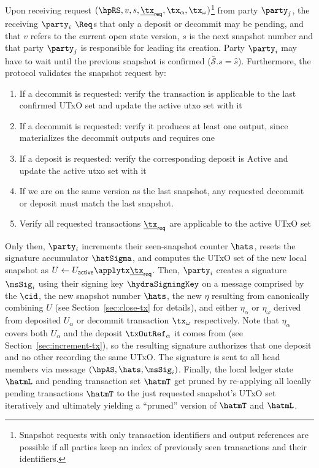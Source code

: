 \quad Upon receiving request
$(\hpRS,v,s,\underline{\tx}_{\mathsf{req}}, \tx_\alpha, \tx_\omega)$\footnote{Snapshot
	requests with only transaction identifiers and output references are possible
	if all parties keep an index of previously seen transactions and their
	identifiers.} from party $\party_j$, the receiving $\party_i$ $\Req$s that
only a deposit or decommit may be pending, and that $v$ refers to the current
open state version, $s$ is the next snapshot number and that party $\party_j$ is
responsible for leading its creation. Party $\party_i$ may have to wait until
the previous snapshot is confirmed ($\bar{\mathcal{S}}.s = \hat{s}$).
Furthermore, the protocol validates the snapshot request by:
\begin{enumerate}
	\item If a decommit is requested: verify the transaction is applicable to the
	      last confirmed UTxO set and update the active utxo set with it
	\item If a decommit is requested: verify it produces at least one output,
	      since \mtxDecrement{} materializes the decommit outputs and requires one
	\item If a deposit is requested: verify the corresponding deposit is
	      $\text{Active}$ and update the active utxo set with it
	\item If we are on the same version as the last snapshot, any requested
	      decommit or deposit must match the last snapshot.
	\item Verify all requested transactions $\underline{\tx}_{\mathsf{req}}$ are
	      applicable to the active UTxO set
\end{enumerate}
Only then, $\party_i$ increments their seen-snapshot counter $\hats$, resets the
signature accumulator $\hatSigma$, and computes the UTxO set of the new local
snapshot as
$U \gets U_{\mathsf{active}} \applytx \underline{\tx}_{\mathsf{req}}$. Then,
$\party_i$ creates a signature $\msSig_i$ using their signing key
$\hydraSigningKey$ on a message comprised by the $\cid$, the new snapshot number
$\hats$, the new $\eta$ resulting from canonically combining $U$ (see
Section~\ref{sec:close-tx} for details), and either $\eta_{\alpha}$ or
$\eta_{\omega}$ derived from deposited $U_{\alpha}$ or decommit transaction
$\tx_{\omega}$ respectively. Note that $\eta_{\alpha}$ covers both $U_{\alpha}$
and the deposit $\txOutRef_\alpha$ it comes from (see
Section~\ref{sec:increment-tx}), so the resulting signature authorizes that one
deposit and no other recording the same UTxO. The signature is sent to all head members via
message $(\hpAS,\hats,\msSig_i)$. Finally, the local ledger state $\hatmL$ and
pending transaction set $\hatmT$ get pruned by re-applying all locally pending
transactions $\hatmT$ to the just requested snapshot's UTxO set iteratively and
ultimately yielding a ``pruned'' version of $\hatmT$ and $\hatmL$. \\

